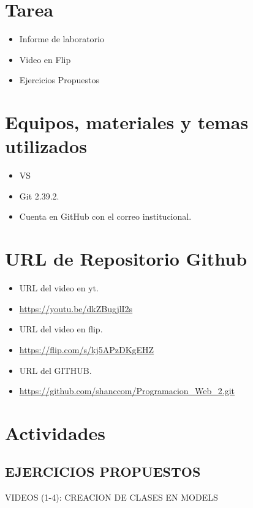 \documentclass{article}
\begin{document}
	\section{Tarea}
	\begin{itemize}		
		\item Informe de laboratorio
            \item Video en Flip
		\item Ejercicios Propuestos
        
	\end{itemize}
		
	\section{Equipos, materiales y temas utilizados}
	\begin{itemize}
		\item VS
		\item Git 2.39.2.
		\item Cuenta en GitHub con el correo institucional.
	\end{itemize}
    \clearpage
    
	\section{URL de Repositorio Github}
	\begin{itemize}
        \item URL del video en yt.
		\item \url{https://youtu.be/dkZBugjlI2s}
        \item URL del video en flip.
		\item \url{https://flip.com/s/kj5APzDKgEHZ}
        \item URL del GITHUB.
            \item \url{https://github.com/shanccom/Programacion_Web_2.git}
	\end{itemize}
	
	\section{Actividades}
	\subsection{EJERCICIOS PROPUESTOS}
        \item VIDEOS (1-4): CREACION DE CLASES EN MODELS
\end{document}

